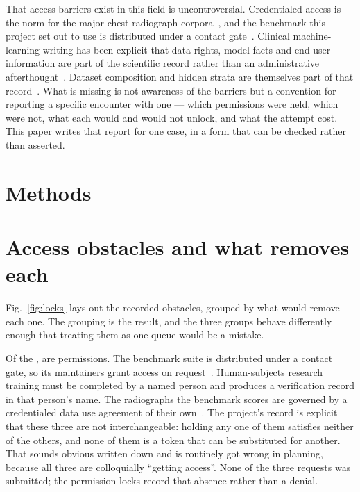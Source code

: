 That access barriers exist in this field is uncontroversial. Credentialed
access is the norm for the major chest-radiograph
corpora~\cite{johnson2019mimiccxr,goldberger2000physionet}, and the benchmark
this project set out to use is distributed under a contact
gate~\cite{chexbench}. Clinical machine-learning writing has been explicit that
data rights, model facts and end-user information are part of the scientific
record rather than an administrative
afterthought~\cite{wilkinson2016fair,esteva2019guide,sendak2020facts,
topol2019high,kelly2019key,he2019practical,nagendran2020ai,liu2019comparison,
vasey2022decide,benjamens2020fda}. Dataset composition and hidden strata are
themselves part of that record~\cite{larrazabal2020gender,
oakdenrayner2020hidden,obermeyer2019dissecting,nazer2023bias}. What is missing
is not awareness of the barriers but a convention for reporting a specific
encounter with one --- which permissions were held, which were not, what each
would and would not unlock, and what the attempt cost. This paper writes that
report for one case, in a form that can be checked rather than asserted.

\section{Methods}


\section{Access obstacles and what removes each}

Fig.~\ref{fig:locks} lays out the \NLocks{} recorded obstacles, grouped by what
would remove each one. The grouping is the result, and the three groups behave
differently enough that treating them as one queue would be a mistake.

Of the \NLocks{}, \NPermissionLocks{} are permissions. The benchmark suite is
distributed under a contact gate, so its maintainers grant access on
request~\cite{chexbench}. Human-subjects research training must be completed by
a named person and produces a verification record in that person's name. The
radiographs the benchmark scores are governed by a credentialed data use
agreement of their own~\cite{johnson2019mimiccxr,goldberger2000physionet}. The
project's record is explicit that these three are not interchangeable: holding
any one of them satisfies neither of the others, and none of them is a token
that can be substituted for another. That sounds obvious written down and is
routinely got wrong in planning, because all three are colloquially ``getting
access''. None of the three requests was submitted; the permission locks
record that absence rather than a denial.

